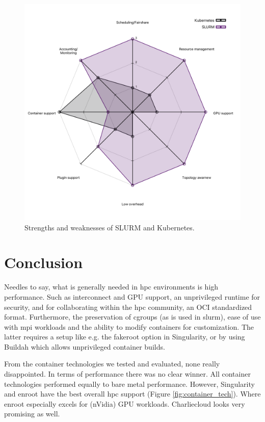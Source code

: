 \documentclass[12pt]{article}
\begin{document}
\begin{figure}[H]
\centering
\includegraphics[scale=0.35]{images/kuber.pdf}
\caption{Strengths and weaknesses of SLURM and Kubernetes.}
\label{fig:kube_vs_slurm}
\end{figure}


\section{Conclusion}
Needles to say, what is generally needed in \gls{hpc} environments is high performance. Such as interconnect and GPU support, an unprivileged runtime for security, and for collaborating within the \gls{hpc} community, an OCI standardized format. Furthermore, the preservation of cgroups (as is used in \gls{slurm}), ease of use with \gls{mpi} workloads and the ability to modify containers for customization. The latter requires a setup like e.g. the fakeroot option in Singularity, or by using Buildah which allows unprivileged container builds.

From the container technologies we tested and evaluated, none really disappointed. In terms of performance there was no clear winner. All container technologies performed equally to bare metal performance. However, Singularity and enroot have the best overall \gls{hpc} support (Figure \ref{fig:container_tech}). Where enroot especially excels for (nVidia) GPU workloads. Charliecloud looks very promising as well.
\end{document}
